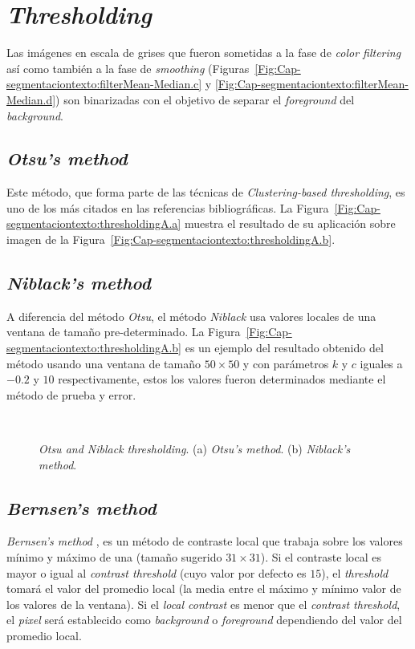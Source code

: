 \section{\textit{Thresholding}}
Las imágenes en escala de grises que fueron sometidas a la fase de 
\textit{color filtering} así como también a la fase de \textit{smoothing}
(Figuras~\ref{Fig:Cap-segmentaciontexto:filterMean-Median.c} y
\ref{Fig:Cap-segmentaciontexto:filterMean-Median.d}) son binarizadas con el
objetivo de separar el \textit{foreground} del \textit{background}.

\subsection{\textit{Otsu's method}}
Este método, que forma parte de las técnicas de \textit{Clustering-based 
thresholding}, es uno de los más citados en las referencias bibliográficas. La
Figura~\ref{Fig:Cap-segmentaciontexto:thresholdingA.a} muestra el resultado de
su aplicación sobre imagen de la
Figura~\ref{Fig:Cap-segmentaciontexto:thresholdingA.b}.

\subsection{\textit{Niblack's method}}
A diferencia del método \textit{Otsu}, el método \textit{Niblack} usa valores
locales de una ventana de tamaño pre-determinado. La
Figura~\ref{Fig:Cap-segmentaciontexto:thresholdingA.b} es un ejemplo del
resultado obtenido del método usando una ventana de tamaño $50 \times 50$ y con
parámetros $k$ y $c$ iguales a $-0.2$ y $10$ respectivamente, estos los valores
fueron determinados mediante el método de prueba y error.

\begin{figure}[h!]
	\centering
	\setlength{\fboxsep}{0pt}
   { }
   \\
  \caption[\textit{Otsu and Niblack thresholding}]{\textit{Otsu and Niblack 
  thresholding}. (a) \textit{Otsu's method}. (b) \textit{Niblack's method}.}
	\label{Fig:Cap-segmentaciontexto:thresholdingA}
\end{figure}

\subsection{\textit{Bernsen's method}}
\textit{Bernsen's method} \cite{Bernsen:1986:DTofGI}, es un método de 
contraste local que trabaja sobre los valores mínimo y máximo de una (tamaño
sugerido $31 \times 31$). Si el contraste local es mayor o igual al
\textit{contrast threshold} (cuyo valor por defecto es $15$), el
\textit{threshold} tomará el valor del promedio local (la media entre el máximo
y mínimo valor de los valores de la ventana). Si el \textit{local contrast} es
menor que el \textit{contrast threshold}, el \textit{pixel} será establecido
como \textit{background} o \textit{foreground} dependiendo del valor del
promedio local.

